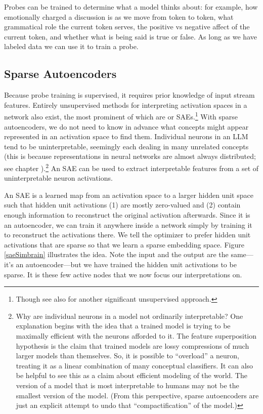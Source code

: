 Probes can be trained to determine what a model thinks about: for example, how
emotionally charged a discussion is as we move from token to token, what
grammatical role the current token serves, the positive vs negative affect of
the current token, and whether what is being said is true or false. As long as
we have labeled data we can use it to train a probe.

\subsection{Sparse Autoencoders}

Because probe training is supervised, it requires prior knowledge of input
stream features. Entirely unsupervised methods for interpreting activation
spaces in a network also exist, the most prominent of which are
 or SAEs.\footnote{Though see also
\cite{burns2024discovering} for another significant unsupervised approach.}
With sparse autoencoders, we do not need to know in advance what concepts might
appear represented in an activation space to find them. Individual neurons in
an LLM tend to be uninterpretable, seemingly each dealing in many unrelated
concepts \cite{elhage2022superposition, scherlis2025polysemanticity} (this is
because representations in neural networks are almost always distributed; see
chapter ).\footnote{Why are individual neurons in a model not
ordinarily interpretable? One explanation begins with the idea that a trained
model is trying to be maximally efficient with the neurons afforded to it. The
feature superposition hypothesis is the claim that trained models are lossy
compressions of much larger models than themselves. So, it is possible to
``overload'' a neuron, treating it as a linear combination of many conceptual
classifiers. It can also be helpful to see this as a claim about efficient
modeling of the world. The version of a model that is most interpretable to
humans may not be the smallest version of the model. (From this perspective,
sparse autoencoders are just an explicit attempt to undo that
``compactification'' of the model.)} An SAE can be used to extract
interpretable features from a set of uninterpretable neuron activations.

An SAE is a learned map from an activation space to a larger hidden unit space
such that hidden unit activations (1) are mostly zero-valued and (2) contain
enough information to reconstruct the original activation afterwards. Since it
is an autoencoder, we can train it anywhere inside a network simply by training
it to reconstruct the activations there. We tell the optimizer to prefer hidden
unit activations that are sparse so that we learn a sparse embedding space.
Figure \ref{saeSimbrain} illustrates the idea. Note the input and the output
are the same---it's an autoencoder---but we have trained the hidden unit
activations to be sparse. It is these few active nodes that we now focus our
interpretations on.

